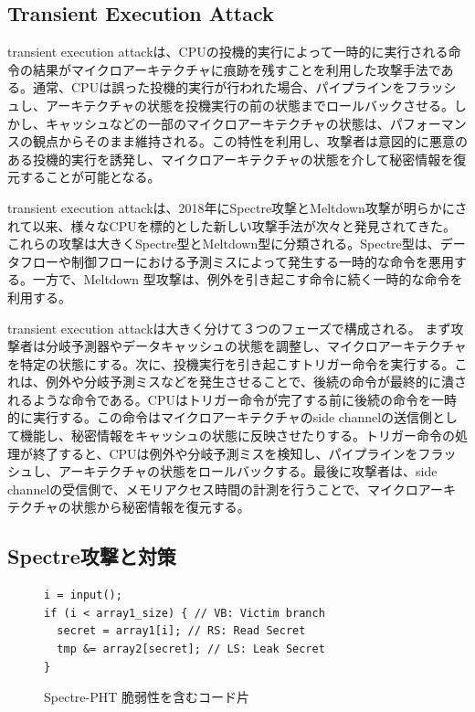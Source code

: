 \subsection{Transient Execution Attack}

transient execution attackは、CPUの投機的実行によって一時的に実行される命令の結果がマイクロアーキテクチャに痕跡を残すことを利用した攻撃手法である。通常、CPUは誤った投機的実行が行われた場合、パイプラインをフラッシュし、アーキテクチャの状態を投機実行の前の状態までロールバックさせる。しかし、キャッシュなどの一部のマイクロアーキテクチャの状態は、パフォーマンスの観点からそのまま維持される。この特性を利用し、攻撃者は意図的に悪意のある投機的実行を誘発し、マイクロアーキテクチャの状態を介して秘密情報を復元することが可能となる。\par

transient execution attackは、2018年にSpectre攻撃\cite{8835233}とMeltdown攻撃\cite{217478}が明らかにされて以来、様々なCPUを標的とした新しい攻撃手法が次々と発見されてきた。これらの攻撃は大きくSpectre型\cite{8835233,220586,10.1145/3243734.3243761,horn2018speculative}とMeltdown型\cite{217478,van2018foreshadow,stecklina2018lazyfp,van2019ridl,van2020lvi}に分類される\cite{canella2019systematic}。Spectre型は、データフローや制御フローにおける予測ミスによって発生する一時的な命令を悪用する。一方で、Meltdown 型攻撃は、例外を引き起こす命令に続く一時的な命令を利用する。\par

transient execution attackは大きく分けて３つのフェーズで構成される。
まず攻撃者は分岐予測器やデータキャッシュの状態を調整し、マイクロアーキテクチャを特定の状態にする。次に、投機実行を引き起こすトリガー命令を実行する。これは、例外や分岐予測ミスなどを発生させることで、後続の命令が最終的に潰されるような命令である。CPUはトリガー命令が完了する前に後続の命令を一時的に実行する。この命令はマイクロアーキテクチャのside channelの送信側として機能し、秘密情報をキャッシュの状態に反映させたりする。トリガー命令の処理が終了すると、CPUは例外や分岐予測ミスを検知し、パイプラインをフラッシュし、アーキテクチャの状態をロールバックする。最後に攻撃者は、side channelの受信側で、メモリアクセス時間の計測を行うことで、マイクロアーキテクチャの状態から秘密情報を復元する。\par

\subsection{Spectre攻撃と対策}

\begin{figure}
  \begin{verbatim}
i = input();
if (i < array1_size) { // VB: Victim branch
  secret = array1[i]; // RS: Read Secret 
  tmp &= array2[secret]; // LS: Leak Secret  
}
\end{verbatim}
  \caption{Spectre-PHT 脆弱性を含むコード片}
  \label{BCB}
\end{figure}

